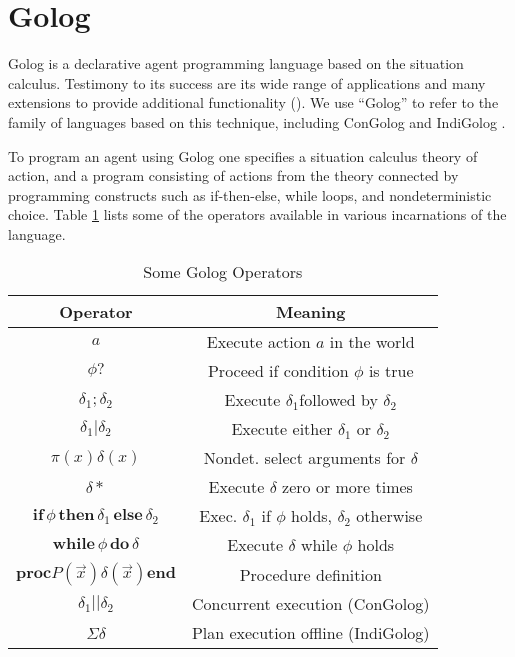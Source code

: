 \section{Golog\label{sec:Background:Golog}}

Golog \citet{levesque97golog} is a declarative agent programming
language based on the situation calculus. Testimony to its success
are its wide range of applications and many extensions to provide
additional functionality (\citet{giacomo00congolog,giacomo99indigolog,Ferrein2005readylog}).
We use {}``Golog'' to refer to the family of languages based on
this technique, including ConGolog \citet{giacomo00congolog} and
IndiGolog \citet{giacomo99indigolog}.

To program an agent using Golog one specifies a situation calculus
theory of action, and a program consisting of actions from the theory
connected by programming constructs such as if-then-else, while loops,
and nondeterministic choice. Table \ref{tbl:Golog-Operators} lists
some of the operators available in various incarnations of the language.%
\begin{table}
\begin{centering}
\begin{tabular}{|c|c|}
\hline 
Operator  & Meaning\tabularnewline
\hline
\hline 
$a$  & Execute action $a$ in the world\tabularnewline
\hline 
$\phi?$  & Proceed if condition $\phi$ is true\tabularnewline
\hline 
$\delta_{1};\delta_{2}$  & Execute $\delta_{1}$followed by $\delta_{2}$\tabularnewline
\hline 
$\delta_{1}|\delta_{2}$  & Execute either $\delta_{1}$ or $\delta_{2}$\tabularnewline
\hline 
$\pi(x)\delta(x)$  & Nondet. select arguments for $\delta$\tabularnewline
\hline 
$\delta*$  & Execute $\delta$ zero or more times\tabularnewline
\hline 
$\mathbf{if}\,\phi\,\mathbf{then}\,\delta_{1}\,\mathbf{else}\,\delta_{2}$  & Exec. $\delta_{1}$ if $\phi$ holds, $\delta_{2}$ otherwise\tabularnewline
\hline 
$\mathbf{while\,}\phi\mathbf{\, do}\,\delta$  & Execute $\delta$ while $\phi$ holds\tabularnewline
\hline 
$\mathbf{proc}P(\overrightarrow{x})\delta(\overrightarrow{x})\mathbf{end}$  & Procedure definition\tabularnewline
\hline 
$\delta_{1}||\delta_{2}$  & Concurrent execution (ConGolog)\tabularnewline
\hline 
$\Sigma\delta$  & Plan execution offline (IndiGolog)\tabularnewline
\hline
\end{tabular}
\par\end{centering}

\caption{ Some Golog Operators\label{tbl:Golog-Operators} }

\end{table}


